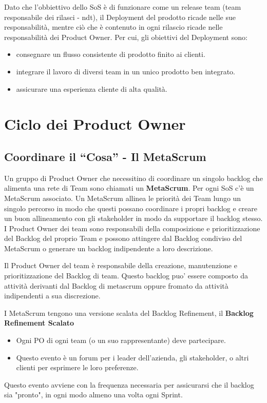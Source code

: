\documentclass[italian,12pt,a4paper,parskip=full]{scrartcl}
\begin{document}
Dato che l'obbiettivo dello SoS è di funzionare come un release team (team responsabile dei rilasci - ndt), il Deployment del prodotto ricade nelle sue responsabilità, mentre ciò che è contenuto in ogni rilascio ricade nelle responsabilità dei Product Owner. Per cui, gli obiettivi del Deployment sono:
\begin{itemize}
\item consegnare un flusso consistente di prodotto finito ai clienti.
\item integrare il lavoro di diversi team in un unico prodotto ben integrato.
\item assicurare una esperienza cliente di alta qualità.
\end{itemize}

\section{Ciclo dei Product Owner}
\subsection{Coordinare il ``Cosa'' - Il MetaScrum}
Un gruppo di Product Owner che necessitino di coordinare un singolo backlog che alimenta una rete di Team sono chiamati un \textbf{MetaScrum}. Per ogni SoS c'è un MetaScrum associato. Un MetaScrum allinea le priorità dei Team lungo un singolo percorso in modo che questi possano coordinare i propri backlog e creare un buon allineamento con gli stakeholder in modo da supportare il backlog stesso. I Product Owner dei team sono responsabili della composizione e prioritizzazione del Backlog del proprio Team e possono attingere dal Backlog condiviso del MetaScrum o generare un backlog indipendente a loro descrizione.

Il Product Owner del team è responsabile della creazione, manutenzione e prioritizzazione del Backlog di team. Questo backlog puo' essere composto da attività derivanti dal Backlog di metascrum oppure fromato da attività indipendenti a sua discrezione.

I MetaScrum tengono una versione scalata del Backlog Refinement, il \textbf{Backlog Refinement Scalato} 
\begin{itemize}
\item Ogni PO di ogni team (o un suo rappresentante) deve partecipare.
\item Questo evento è un forum per i leader dell'azienda, gli stakeholder, o altri clienti per esprimere le loro preferenze.
\end{itemize}
Questo evento avviene con la frequenza necessaria per assicurarsi che il backlog sia "pronto", in ogni modo almeno una volta ogni Sprint.
\end{document}
